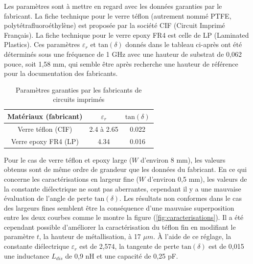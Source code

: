 \documentclass[french]{article}
\begin{document}
Les paramètres sont à mettre en regard avec les données garanties par le fabricant. La fiche technique pour le verre téflon (autrement nommé PTFE, polytétrafluoroéthylène) est proposée par la société CIF (Circuit Imprimé Français). La fiche technique pour le verre epoxy FR4 est celle de LP (Laminated Plastics). Ces paramètres $\varepsilon_r$ et $\mbox{tan}(\delta)$ donnés dans le tableau ci-après ont été déterminés sous une fréquence de 1 GHz avec une hauteur de substrat de 0,062 pouce, soit 1,58 mm, qui semble être après recherche une hauteur de référence pour la documentation des fabricants.

\newpage

\begin{table}[H]
	\centering
	\begin{tabular}{|c|c|c|}
		\hline
		Matériaux (fabricant) & $\varepsilon_r$ & $\mbox{tan}(\delta)$\\
		\hline
		Verre téflon (CIF) & 2.4 à 2.65 & 0.022\\
		\hline
		Verre epoxy FR4 (LP) & 4.34 & 0.016\\
		\hline
	\end{tabular}
	\caption{Paramètres garanties par les fabricants de circuits imprimés}
\end{table}

Pour le cas de verre téflon et epoxy large ($W$ d'environ 8 mm), les valeurs obtenus sont de même ordre de grandeur que les données du fabricant. En ce qui concerne les caractérisations en largeur fine ($W$ d'environ 0,5 mm), les valeurs de la constante diélectrique ne sont pas aberrantes, cependant il y a une mauvaise évaluation de l'angle de perte $\mbox{tan}(\delta)$. Les résultats non conformes dans le cas des largeurs fines semblent être la conséquence d'une mauvaise superposition entre les deux courbes comme le montre la figure (\ref{fig:caracterisations}). Il a été cependant possible d'améliorer la caractérisation du téflon fin en modifiant le paramètre $t$, la hauteur de métallisation, à 17 $\mu m$. À l'aide de ce réglage, la constante diélectrique $\varepsilon_r$ est de 2,574, la tangente de perte $\mbox{tan}(\delta)$ est de 0,015 une inductance $L_{dis}$ de 0,9 nH et une capacité de 0,25 pF. 
\end{document}
